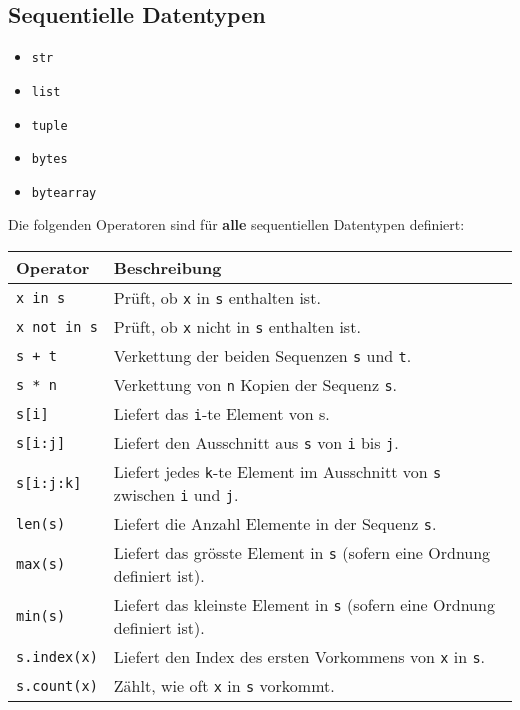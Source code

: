\subsection{Sequentielle Datentypen}
\begin{itemize}
	\item \texttt{str}
	\item \texttt{list}
	\item \texttt{tuple}
	\item \texttt{bytes}
	\item \texttt{bytearray}
\end{itemize}
Die folgenden Operatoren sind für \textbf{alle} sequentiellen Datentypen definiert:\\
\begin{tabular}{|l|l|}
	\hline 
	\textbf{Operator} &\textbf{Beschreibung}\\ 
	\hline 
	\texttt{x in s} &Prüft, ob \texttt{x} in \texttt{s} enthalten ist.\\ 
	\texttt{x not in s} &Prüft, ob \texttt{x} nicht in \texttt{s} enthalten ist.\\
	\texttt{s + t} &Verkettung der beiden Sequenzen \texttt{s} und \texttt{t}.\\ 
	\texttt{s * n} &Verkettung von \texttt{n} Kopien der Sequenz \texttt{s}.\\ 
	\texttt{s[i]} &Liefert das \texttt{i}-te Element von s.\\ 
	\texttt{s[i:j]} &Liefert den Ausschnitt aus \texttt{s} von \texttt{i} bis \texttt{j}.\\
	\texttt{s[i:j:k]} &Liefert jedes \texttt{k}-te Element im Ausschnitt von \texttt{s} zwischen \texttt{i} und \texttt{j}.\\
	\texttt{len(s)} &Liefert die Anzahl Elemente in der Sequenz \texttt{s}.\\
	\texttt{max(s)} &Liefert das grösste Element in \texttt{s} (sofern eine Ordnung definiert ist).\\
	\texttt{min(s)} &Liefert das kleinste Element in \texttt{s} (sofern eine Ordnung definiert ist).\\
	\texttt{s.index(x)} &Liefert den Index des ersten Vorkommens von \texttt{x} in \texttt{s}.\\
	\texttt{s.count(x)} &Zählt, wie oft \texttt{x} in \texttt{s} vorkommt.\\
	\hline 
\end{tabular}

